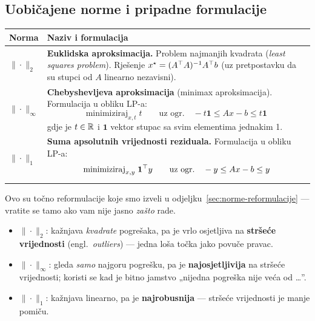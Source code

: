 \subsection{Uobičajene norme i pripadne formulacije}

\begin{center}
\begin{tabular}{P{2.2cm}P{10.8cm}}
\toprule
\textbf{Norma} & \textbf{Naziv i formulacija} \\
\midrule
$\|\cdot\|_2$
  & \textbf{Euklidska aproksimacija.} Problem najmanjih kvadrata (\emph{least
    squares problem}). Rješenje $x^\star = (A^{\top} A)^{-1}A^{\top} b$ (uz pretpostavku
    da su stupci od $A$ linearno nezavisni). \\
\midrule
$\|\cdot\|_\infty$
  & \textbf{Chebyshevljeva aproksimacija} (minimax aproksimacija). Formulacija
    u obliku LP-a:
    \[
    \text{minimiziraj}_{x,t}\; t
    \qquad\text{uz ogr.}\quad -t\mathbf{1} \le Ax - b \le t\mathbf{1}
    \]
    gdje je $t \in \mathbb{R}$ i $\mathbf{1}$ vektor stupac sa svim elementima jednakim
    1. \\
\midrule
$\|\cdot\|_1$
  & \textbf{Suma apsolutnih vrijednosti reziduala.} Formulacija u obliku LP-a:
    \[
    \text{minimiziraj}_{x,y}\; \mathbf{1}^{\top} y
    \qquad\text{uz ogr.}\quad -y \le Ax - b \le y
    \]
    \\
\bottomrule
\end{tabular}
\end{center}

Ovo su točno reformulacije koje smo izveli u odjeljku~\ref{sec:norme-reformulacije} --- vratite se
tamo ako vam nije jasno \emph{zašto} rade.

\begin{napomena}
\begin{itemize}
  \item $\|\cdot\|_2$: kažnjava \emph{kvadrate} pogrešaka, pa je vrlo osjetljiva
        na \textbf{stršeće vrijednosti} (engl.\ \emph{outliers}) --- jedna loša
        točka jako povuče pravac.
  \item $\|\cdot\|_\infty$: gleda \emph{samo} najgoru pogrešku, pa je
        \textbf{najosjetljivija} na stršeće vrijednosti; koristi se kad je
        bitno jamstvo „nijedna pogreška nije veća od \dots”.
  \item $\|\cdot\|_1$: kažnjava linearno, pa je \textbf{najrobusnija} ---
        stršeće vrijednosti je manje pomiču.
\end{itemize}
\end{napomena}

